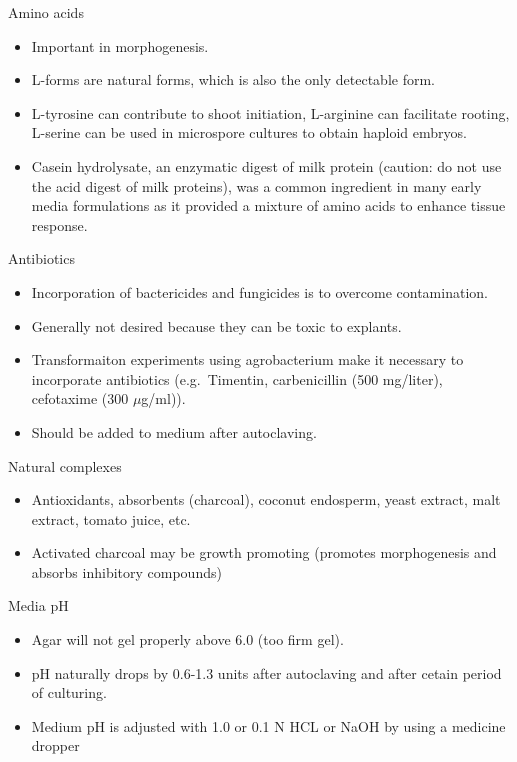 \documentclass[
  ignorenonframetext,
  aspectratio=169]{beamer}
\providecommand{\tightlist}{%
  \setlength{\itemsep}{0pt}\setlength{\parskip}{0pt}}
\begin{document}
\begin{frame}{Amino acids}
\protect\hypertarget{amino-acids}{}
\begin{itemize}
\tightlist
\item
  Important in morphogenesis.
\item
  L-forms are natural forms, which is also the only detectable form.
\item
  L-tyrosine can contribute to shoot initiation, L-arginine can
  facilitate rooting, L-serine can be used in microspore cultures to
  obtain haploid embryos.
\item
  Casein hydrolysate, an enzymatic digest of milk protein (caution: do
  not use the acid digest of milk proteins), was a common ingredient in
  many early media formulations as it provided a mixture of amino acids
  to enhance tissue response.
\end{itemize}
\end{frame}

\begin{frame}{Antibiotics}
\protect\hypertarget{antibiotics}{}
\begin{itemize}
\tightlist
\item
  Incorporation of bactericides and fungicides is to overcome
  contamination.
\item
  Generally not desired because they can be toxic to explants.
\item
  Transformaiton experiments using agrobacterium make it necessary to
  incorporate antibiotics (e.g.~Timentin, carbenicillin (500 mg/liter),
  cefotaxime (300 \(\mu\)g/ml)).
\item
  Should be added to medium after autoclaving.
\end{itemize}
\end{frame}

\begin{frame}{Natural complexes}
\protect\hypertarget{natural-complexes}{}
\begin{itemize}
\tightlist
\item
  Antioxidants, absorbents (charcoal), coconut endosperm, yeast extract,
  malt extract, tomato juice, etc.
\item
  Activated charcoal may be growth promoting (promotes morphogenesis and
  absorbs inhibitory compounds)
\end{itemize}
\end{frame}

\begin{frame}{Media pH}
\protect\hypertarget{media-ph}{}
\begin{itemize}
\tightlist
\item
  Agar will not gel properly above 6.0 (too firm gel).
\item
  pH naturally drops by 0.6-1.3 units after autoclaving and after cetain
  period of culturing.
\item
  Medium pH is adjusted with 1.0 or 0.1 N HCL or NaOH by using a
  medicine dropper
\end{itemize}
\end{frame}
\end{document}
